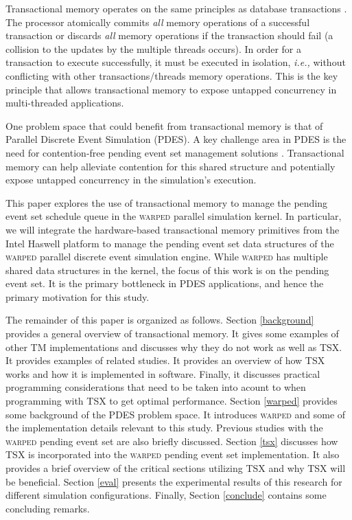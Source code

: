 \documentclass{sig-alternate}
\begin{document}
Transactional memory operates on the same principles as database transactions
\cite{tm_2nd}.  The processor atomically commits \emph{all} memory operations of a
successful transaction or discards \emph{all} memory operations if the transaction should
fail (a collision to the updates by the multiple threads occurs).  In order for a
transaction to execute successfully, it must be executed in isolation, \emph{i.e.,}
without conflicting with other transactions/threads memory operations.  This is the key
principle that allows transactional memory to expose untapped concurrency in
multi-threaded applications.

One problem space that could benefit from transactional memory is that of Parallel
Discrete Event Simulation (PDES).  A key challenge area in PDES is the need for
contention-free pending event set management solutions \cite{dickman}.  Transactional
memory can help alleviate contention for this shared structure and potentially expose
untapped concurrency in the simulation's execution.

This paper explores the use of transactional memory to manage the pending event set
schedule queue in the \textsc{warped} parallel simulation kernel.  In particular, we will
integrate the hardware-based transactional memory primitives from the Intel Haswell
platform to manage the pending event set data structures of the \textsc{warped} parallel
discrete event simulation engine.  While \textsc{warped} has multiple shared data
structures in the kernel, the focus of this work is on the pending event set.  It is the
primary bottleneck in PDES applications, and hence the primary motivation for this study.

The remainder of this paper is organized as follows.  Section \ref{background}
provides a general overview of transactional memory.  It gives some examples of
other TM implementations and discusses why they do not work as well as TSX.  It
provides examples of related studies.  It provides an overview of how TSX works
and how it is implemented in software.  Finally, it discusses practical
programming considerations that need to be taken into acount to when
programming with TSX to get optimal performance.  Section \ref{warped} provides
some background of the PDES problem space.  It introduces \textsc{warped} and
some of the implementation details relevant to this study.  Previous studies
with the \textsc{warped} pending event set are also briefly discussed.  Section
\ref{tsx} discusses how TSX is incorporated into the \textsc{warped} pending
event set implementation.  It also provides a brief overview of the critical
sections utilizing TSX and why TSX will be beneficial.  Section \ref{eval}
presents the experimental results of this research for different simulation
configurations.  Finally, Section \ref{conclude} contains some concluding
remarks.
\end{document}
